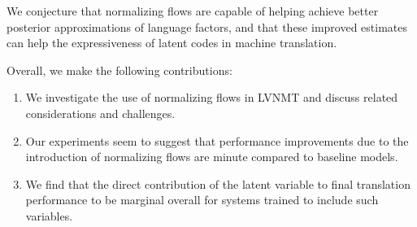 We conjecture that normalizing flows are capable of helping achieve better posterior approximations of language factors, and that these improved estimates can help the expressiveness of latent codes in machine translation. %



Overall, we make the following contributions:
\begin{enumerate}
	\item We investigate the use of normalizing flows in \ac{LVNMT} and discuss related considerations and challenges.
	
	\item Our experiments seem to suggest that performance improvements due to the introduction of normalizing flows are minute compared to baseline models. 
	
	\item We find that the direct contribution of the latent variable to final translation performance to be marginal overall for systems trained to include such variables.
\end{enumerate}

